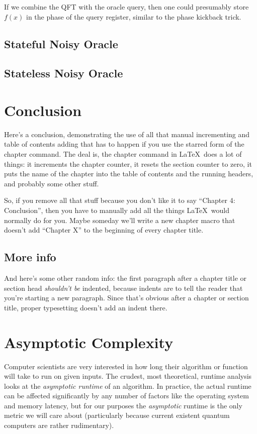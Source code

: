 \documentclass[12pt,twoside]{reedthesis}
\theoremstyle{definition}
\begin{document}
If we combine the QFT with the oracle query, then one could presumably store $f(x)$ in the phase of the query register, similar to the phase kickback trick. 



\section{Stateful Noisy Oracle}
\section{Stateless Noisy Oracle}

\chapter*{Conclusion}
	\setcounter{chapter}{6}
	\setcounter{section}{0}
	
Here's a conclusion, demonstrating the use of all that manual incrementing and table of contents adding that has to happen if you use the starred form of the chapter command. The deal is, the chapter command in \LaTeX\ does a lot of things: it increments the chapter counter, it resets the section counter to zero, it puts the name of the chapter into the table of contents and the running headers, and probably some other stuff. 

So, if you remove all that stuff because you don't like it to say ``Chapter 4: Conclusion'', then you have to manually add all the things \LaTeX\ would normally do for you. Maybe someday we'll write a new chapter macro that doesn't add ``Chapter X'' to the beginning of every chapter title.

\section{More info}
And here's some other random info: the first paragraph after a chapter title or section head \emph{shouldn't be} indented, because indents are to tell the reader that you're starting a new paragraph. Since that's obvious after a chapter or section title, proper typesetting doesn't add an indent there. 


    \appendix
    	\chapter{Asymptotic Complexity}
    	Computer scientists are very interested in how long their algorithm or function will take to run on given inputs. The crudest, most theoretical, runtime analysis looks at the \textit{asymptotic runtime} of an algorithm. In practice, the actual runtime can be affected significantly by any number of factors like the operating system and memory  latency, but for our purposes the 
\textit{asymptotic} runtime is the only metric we will care about (particularly because current existent quantum computers are rather rudimentary).
\end{document}
